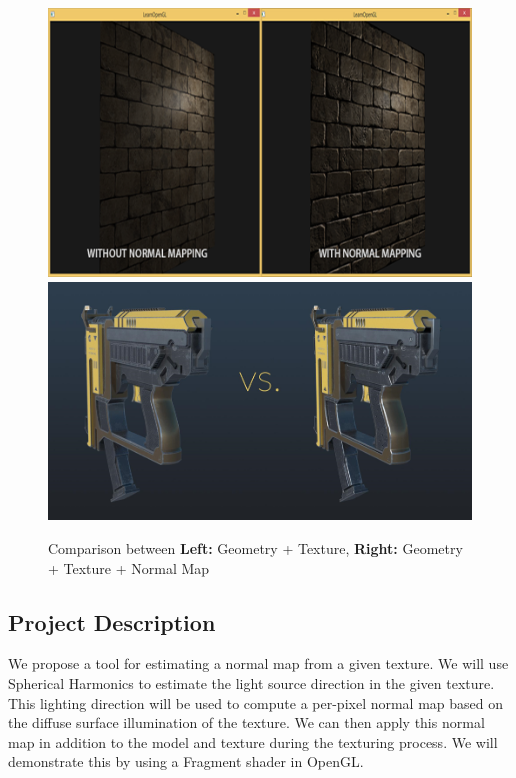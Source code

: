 \documentclass[10pt,twocolumn,letterpaper]{article}
\begin{document}
\begin{figure}[h]
	\begin{center}
		\includegraphics [scale=0.35] {image/wall.png}
		\includegraphics [scale=0.35] {image/gun.png}
	\end{center}
	\caption{Comparison between \textbf{Left:} Geometry + Texture, \textbf{Right:} Geometry + Texture + Normal Map}
	\label{fig:vgg-16}
\end{figure} 

\subsection{Project Description}
We propose a tool for estimating a normal map from a given texture. We will use Spherical Harmonics to estimate the light source direction in the given texture. This lighting direction will be used to compute a per-pixel normal map based on the diffuse surface illumination of the texture. We can then apply this normal map in addition to the model and texture during the texturing process. We will demonstrate this by using a Fragment shader in OpenGL.
\end{document}
